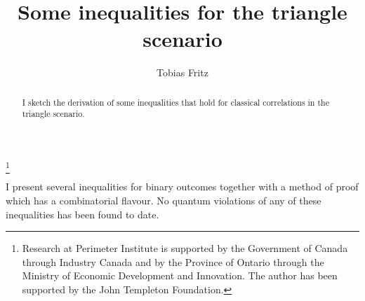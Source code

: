 \documentclass[aps,english,superscriptaddress,twocolumn,twoside,prl]{revtex4-1}%
\theoremstyle{plain}
\theoremstyle{definition}
\theoremstyle{remark}
\numberwithin{equation}{section}
\begin{document}




\title[]{Some inequalities for the triangle scenario}

\author{Tobias Fritz}



\thanks{
Research at Perimeter Institute is supported by the Government of Canada through Industry Canada and by the Province of Ontario through the Ministry of Economic Development and Innovation. The author has been supported by the John Templeton Foundation.}

\begin{abstract}
I sketch the derivation of some inequalities that hold for classical correlations in the triangle scenario.
\end{abstract}

\maketitle
\onecolumngrid
I present several inequalities for binary outcomes together with a method of proof which has a combinatorial flavour. No quantum violations of any of these inequalities has been found to date.
\end{document}
